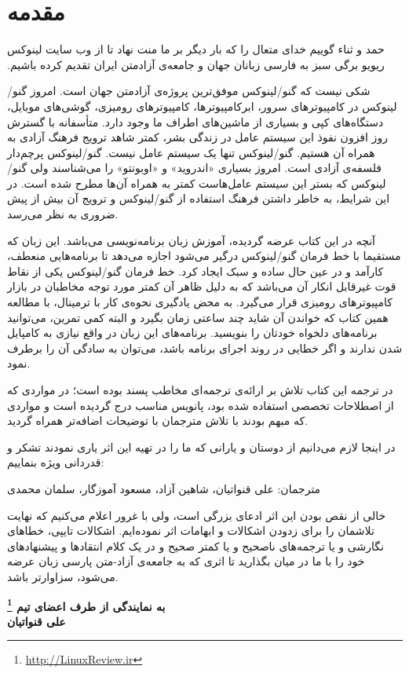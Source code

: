 \chapter*{مقدمه}
‫حمد و ثناء گوییم خدای متعال را که بار دیگر بر ما منت نهاد تا از وب سایت لینوکس
ریویو برگی سبز به فارسی زبانان جهان و جامعه‌ی آزادمتن ایران تقدیم کرده باشیم.

شکی نیست که گنو/لینوکس موفق‌ترین پروژه‌ی آزادمتن جهان است. امروز گنو/لینوکس در کامپیوترهای
سرور، ابرکامپیوترها، کامپیوترهای رومیزی، گوشی‌های موبایل، دستگاه‌های کپی و بسیاری
از ماشین‌های اطراف ما وجود دارد. متأسفانه با گسترش روز افزون نفوذ این سیستم عامل
در زندگی بشر، کمتر شاهد ترویج فرهنگ آزادی به همراه آن هستیم. گنو/لینوکس تنها یک
سیستم عامل نیست. گنو/لینوکس پرچم‌دار فلسفه‌ی آزادی است. امروز بسیاری «اندروید» و
«اوبونتو» را می‌شناسند ولی گنو/لینوکس که بستر این سیستم عامل‌هاست کمتر به همراه
آن‌ها مطرح شده است. در این شرایط، به خاطر داشتن فرهنگ استفاده از گنو/لینوکس و ترویج
آن بیش از پیش ضروری به نظر می‌رسد.

آنچه در این کتاب عرضه گردیده، آموزش زبان برنامه‌نویسی
 می‌باشد. این زبان که
مستقیما با خط فرمان گنو/لینوکس درگیر می‌شود اجازه می‌دهد تا برنامه‌هایی منعطف، کارآمد
و در عین حال ساده و سبک ایجاد کرد. خط فرمان گنو/لینوکس یکی از نقاط قوت غیرقابل انکار
آن می‌باشد که به دلیل ظاهر آن کمتر مورد توجه مخاطبان در بازار کامپیوترهای رومیزی
قرار می‌گیرد. به محض یادگیری نحوه‌ی کار با ترمینال، با مطالعه همین کتاب که خواندن
آن شاید چند ساعتی زمان بگیرد و البته کمی تمرین، می‌توانید برنامه‌‌های دلخواه خودتان
را بنویسید. برنامه‌های این زبان در واقع نیازی به کامپایل شدن ندارند و اگر خطایی
در روند اجرای برنامه باشد، می‌توان به سادگی آن را برطرف نمود.

در ترجمه این کتاب تلاش بر ارائه‌ی ترجمه‌ای مخاطب پسند بوده است؛ در مواردی که از
اصطلاحات تخصصی استفاده شده بود، پانویس مناسب درج گردیده است و مواردی که مبهم بودند
با تلاش مترجمان با توضیحات اضافه‌تر همراه گردید.

در اینجا لازم می‌دانیم از دوستان و یارانی که ما را در تهیه این اثر یاری نمودند تشکر
و قدردانی ویژه بنماییم:

مترجمان: علی قنواتیان، شاهین آزاد، مسعود آموزگار، سلمان محمدی

\vspace*{20pt}
خالی از نقص بودن این اثر ادعای بزرگی است، ولی با غرور اعلام می‌کنیم که نهایت تلاشمان
را برای زدودن اشکالات و ابهامات اثر نموده‌ایم. اشکالات تایپی، خطاهای نگارشی و یا
ترجمه‌های ناصحیح و یا کمتر صحیح و در یک کلام انتقادها و پیشنهادهای خود را با ما
در میان بگذارید تا اثری که به جامعه‌ی آزاد-متن پارسی زبان عرضه می‌شود، سزاوارتر
باشد.

\begin{flushleft}
\textbf{
به نمایندگی از طرف اعضای تیم
\footnote{\url{http://LinuxReview.ir}} \\
علی قنواتیان
}
\end{flushleft}